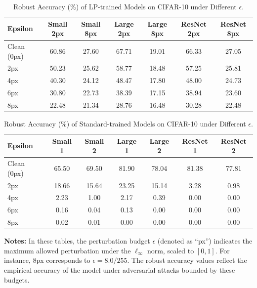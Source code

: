\begin{table}[h]
\small
\centering
\caption{Robust Accuracy (\%) of LP-trained Models on CIFAR-10 under Different $\epsilon$.}
\label{tab:lp_robust_accuracy_detailed}
\begin{tabular}{lcccccc}
\toprule
\textbf{Epsilon} & \textbf{Small 2px} & \textbf{Small 8px} & \textbf{Large 2px} & \textbf{Large 8px} & \textbf{ResNet 2px} & \textbf{ResNet 8px} \\
\midrule
Clean (0px) & 60.86 & 27.60 & 67.71 & 19.01 & 66.33 & 27.05 \\
2px & 50.23 & 25.62 & 58.77 & 18.48 & 57.25 & 25.81 \\
4px & 40.30 & 24.12 & 48.47 & 17.80 & 48.00 & 24.73 \\
6px & 30.80 & 22.73 & 38.39 & 17.15 & 38.94 & 23.60 \\
8px & 22.48 & 21.34 & 28.76 & 16.48 & 30.28 & 22.48 \\
\bottomrule
\end{tabular}
\end{table}

\vspace{1em}

\begin{table}[h]
\small
\centering
\caption{Robust Accuracy (\%) of Standard-trained Models on CIFAR-10 under Different $\epsilon$.}
\label{tab:std_robust_accuracy_detailed}
\begin{tabular}{lcccccc}
\toprule
\textbf{Epsilon} & \textbf{Small 1} & \textbf{Small 2} & \textbf{Large 1} & \textbf{Large 2} & \textbf{ResNet 1} & \textbf{ResNet 2} \\
\midrule
Clean (0px) & 65.50 & 69.50 & 81.90 & 78.04 & 81.38 & 77.81 \\
2px & 18.66 & 15.64 & 23.25 & 15.14 & 3.28 & 0.98 \\
4px & 2.23 & 1.00 & 2.17 & 0.39 & 0.00 & 0.00 \\
6px & 0.16 & 0.04 & 0.13 & 0.00 & 0.00 & 0.00 \\
8px & 0.02 & 0.01 & 0.00 & 0.00 & 0.00 & 0.00 \\
\bottomrule

\end{tabular}
\end{table}

\vspace{1em}

\textbf{Notes:} In these tables, the perturbation budget $\epsilon$ (denoted as ``px'') indicates the maximum allowed perturbation under the $\ell_\infty$ norm, scaled to $[0,1]$. For instance, $8\text{px}$ corresponds to $\epsilon = 8.0/255$. The robust accuracy values reflect the empirical accuracy of the model under adversarial attacks bounded by these budgets.


